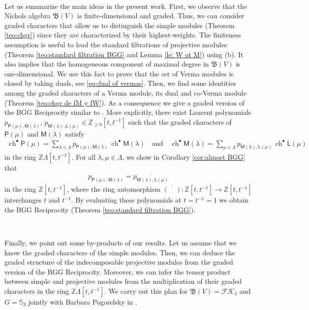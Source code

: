 \documentclass[reqno]{amsart}
\newcommand{\FK}{\mathcal{FK}}
\newcommand{\Sn}{{\mathbb S}}
\renewcommand{\_}[1]{_{\left( #1 \right)}}
\renewcommand{\^}[1]{^{\left( #1 \right)}}
\newcommand\fL{\mathsf{L}}
\newcommand\fM{\mathsf{M}}
\newcommand\fP{\mathsf{P}}
\newcommand{\Z}{{\mathbb Z}}
\newcommand{\BV}{{\mathfrak B}}
\newcommand{\chgr}{\operatorname{ch}^{\bullet}}
\theoremstyle{plain}
\theoremstyle{definition}
\theoremstyle{remark}
\begin{document}
\

Let us summarize the main ideas in the present work. First, we observe that the Nichols algebra $\BV(V)$ is finite-dimensional and graded. Thus, we can consider graded characters that allow us to distinguish the simple modules (Theorem \ref{teo:chgr}) since they are characterized by their highest-weights. The finiteness assumption is useful to lead the standard filtrations of projective modules (Theorem \ref{teo:standard filtration BGG} and Lemma \ref{le: W ot M}) using (b). It also implies that the homogeneous component of maximal degree in $\BV(V)$ is one-dimensional. We use this fact to prove that the set of Verma modules is closed by taking duals, see \eqref{eq:dual of vermas}. Then, we find some identities among the graded characters of a Verma module, its dual and co-Verma module (Theorem \ref{teo:chgr de fM y fW}). As a consequence we give a graded version of the BGG Reciprocity similar to \cite[Theorem 7.6]{MR3335289}. More explicitly,
 there exist Laurent polynomials 
$p_{\fP(\mu),\fM(\lambda)},\,p_{\fM(\lambda),\fL(\mu)}\in\Z_{\geq0}[t,t^{-1}]$ such that the graded characters of $\fP(\mu)$ and $\fM(\lambda)$ satisfy
\begin{align*}
\chgr\fP(\mu)=\sum_{\lambda\in\Lambda}p_{\fP(\mu),\fM(\lambda)}\,\chgr\fM(\lambda)\quad\mbox{and}\quad
\chgr\fM(\lambda)=\sum_{\mu\in\Lambda}p_{\fM(\lambda),\fL(\mu)}\,\chgr\fL(\mu)
\end{align*}
in the ring $\Z\Lambda[t,t^{-1}]$. For all $\lambda,\mu\in\Lambda$, we show in Corollary \ref{cor:almost BGG} that
\begin{align*}
p_{\fP(\mu),\fM(\lambda)}=\overline{p_{\fM(\lambda),\fL(\mu)}}
\end{align*}
in the ring $\Z[t,t^{-1}]$, where the ring automorphism $\overline{(\quad)}:\Z[t,t^{-1}]\rightarrow\Z[t,t^{-1}]$ interchanges $t$ and $t^{-1}$. By evaluating these polynomials at $t=t^{-1}=1$ we obtain the BGG Reciprocity (Theorem \ref{teo:standard filtration BGG}).

\

Finally, we point out some by-products of our results. Let us assume that we know the graded characters of the simple modules. Then, we can deduce the graded structure of the indecomposable projective modules from the graded version of the BGG Reciprocity. Moreover, we can infer the tensor product between simple and projective modules from the multiplication of their graded characters in the ring $\Z\Lambda[t,t^{-1}]$. We carry out this plan for $\BV(V)=\FK_3$ and $G=\Sn_3$ jointly with Barbara Pogorelsky in \cite{PV-in-preparation}.
\end{document}
